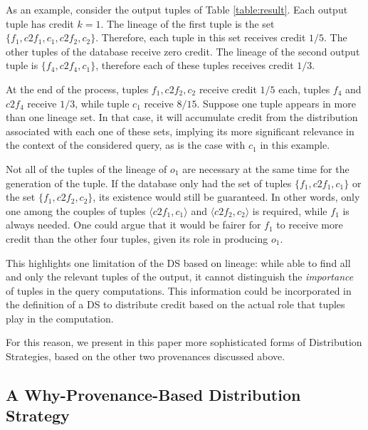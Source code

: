 As an example, consider the output tuples of Table \ref{table:result}.
Each output tuple has credit $k = 1$.
The lineage of the first tuple is the set $\{f_1, c2f_1, c_1, c2f_2, c_2\}$. Therefore, each tuple in this set receives credit $1/5$. The other tuples of the database receive zero credit.
The lineage of the second output tuple is $\{ f_4, c2f_4, c_1\}$, therefore each of these tuples receives credit $1/3$.

At the end of the process, tuples $f_1, c2f_2, c_2$ receive credit $1/5$ each, tuples $f_4$ and $c2f_4$ receive $1/3$, while tuple $c_1$ receive $8/15$.  
Suppose one tuple appears in more than one lineage set. In that case, it will accumulate credit from the distribution associated with each one of these sets, implying its more significant relevance in the context of the considered query, as is the case with $c_1$ in this example.
 
Not all of the tuples of the lineage of $o_1$ are necessary at the same time for the generation of the tuple. 
If the database only had the set of  tuples $\{f_1, c2f_1, c_1\}$ or the set $\{f_1, c2f_2, c_2\}$, its existence would still be guaranteed. 
In other words, only one among the couples of tuples $\langle c2f_1, c_1 \rangle$ and $\langle c2f_2, c_2 \rangle$ is required, while $f_1$ is always needed. 
One could argue that it would be fairer for $f_1$ to receive more credit than the other four tuples, given its role in producing $o_1$.  

This highlights one limitation of the DS based on lineage: while able to find all and only the relevant tuples of the output, it cannot distinguish the \emph{importance} of tuples in the query computations. 
This information could be incorporated in the definition of a DS to distribute credit based on the actual role that tuples play in the computation. 

For this reason, we present in this paper more sophisticated forms of Distribution Strategies, based on the other two provenances discussed above.

\subsection{A Why-Provenance-Based Distribution Strategy}

